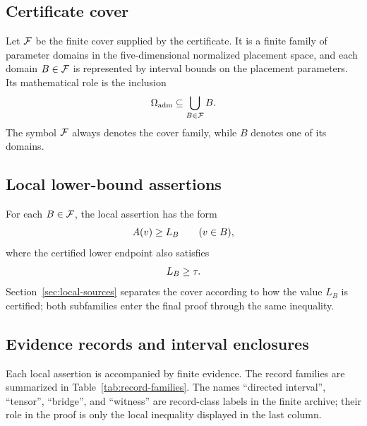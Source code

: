 \documentclass[11pt]{article}
\begin{document}
\subsection{Certificate cover}

Let \(\mathcal{F}\) be the finite cover supplied by the certificate.  It is a finite family of parameter domains in the five-dimensional normalized placement space, and each domain \(B\in\mathcal{F}\) is represented by interval bounds on the placement parameters.  Its mathematical role is the inclusion
\[
\Omega_{\mathrm{adm}}\subseteq \bigcup_{B\in\mathcal{F}}B.
\]
The symbol \(\mathcal{F}\) always denotes the cover family, while \(B\) denotes one of its domains.

\subsection{Local lower-bound assertions}

For each \(B\in\mathcal{F}\), the local assertion has the form
\[
A(v)\ge L_B\qquad(v\in B),
\]
where the certified lower endpoint also satisfies
\[
L_B\ge\tau.
\]
Section~\ref{sec:local-sources} separates the cover according to how the value \(L_B\) is certified; both subfamilies enter the final proof through the same inequality.

\subsection{Evidence records and interval enclosures}

Each local assertion is accompanied by finite evidence.  The record families are summarized in Table~\ref{tab:record-families}.  The names ``directed interval'', ``tensor'', ``bridge'', and ``witness'' are record-class labels in the finite archive; their role in the proof is only the local inequality displayed in the last column.
\end{document}
